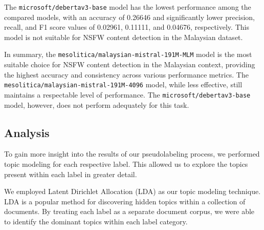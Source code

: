\documentclass[preprint]{article}
\begin{document}
The \texttt{microsoft/debertav3-base} model has the lowest performance among the compared models, with an accuracy of 0.26646 and significantly lower precision, recall, and F1 score values of 0.02961, 0.11111, and 0.04676, respectively. This model is not suitable for NSFW content detection in the Malaysian dataset.

In summary, the \texttt{mesolitica/malaysian-mistral-191M-MLM} model is the most suitable choice for NSFW content detection in the Malaysian context, providing the highest accuracy and consistency across various performance metrics. The \texttt{mesolitica/malaysian-mistral-191M-4096} model, while less effective, still maintains a respectable level of performance. The \texttt{microsoft/debertav3-base} model, however, does not perform adequately for this task.

\subsection{Analysis}

To gain more insight into the results of our pseudolabeling process, we performed topic modeling for each respective label. This allowed us to explore the topics present within each label in greater detail.

We employed Latent Dirichlet Allocation (LDA) as our topic modeling technique. LDA is a popular method for discovering hidden topics within a collection of documents. By treating each label as a separate document corpus, we were able to identify the dominant topics within each label category.
\end{document}
